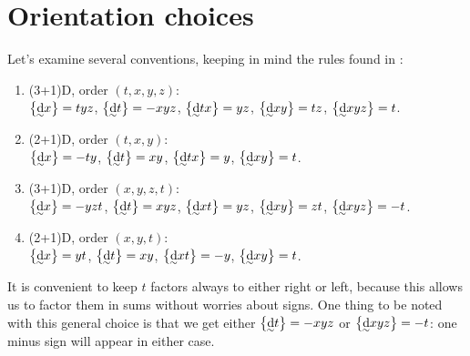 \documentclass[\ifafour a4paper,12pt,\else a5paper,10pt,\fi%
onecolumn,oneside,article,%
british%
]{memoir}
\theoremstyle{remark}
\theoremstyle{innote}
\newcommand*{\di}{\mathrm{d}}%
\DeclarePairedDelimiter\set{\{}{\}} %
\renewcommand*{\|}[1][]{\nonscript\:#1\vert\nonscript\:\mathopen{}}
\newcommand*{\eqns}{eqs}%
\newcommand*{\tw}[2][\scriptstyle\sim]{\smash[b]{\underset{\mathclap{{}^{#1}}}{#2}}}
\newcommand*{\ti}[1][\scriptstyle\sim]{\tw[#1]{\di}}
\begin{document}
\iffalse
\section{Orientation choices}
\label{sec:orientation_choices}

Let's examine several conventions, keeping in mind the rules found in  \cites[\eqns~(5)--(11)]{burke1983}:
\begin{enumerate}[label=(\roman*),para]
\item (3+1)D, order $(t,x,y,z)$:\\
  $\set[\big]{\ti x} = tyz$,\;  $\set[\big]{\ti t} = -xyz$,\;
  $\set[\big]{\ti tx} = yz$,\;  $\set[\big]{\ti xy } = tz$,\;
  $\set[\big]{\ti xyz}=t$.
\item (2+1)D, order $(t,x,y)$:\\
  $\set[\big]{\ti x} = -ty$,\;  $\set[\big]{\ti t} = xy$,\;
  $\set[\big]{\ti tx} = y$,\;  $\set[\big]{\ti xy } = t$.
\item (3+1)D, order $(x,y,z,t)$:\\
  $\set[\big]{\ti x} = -yzt$,\;  $\set[\big]{\ti t} = xyz$,\;
  $\set[\big]{\ti xt} = yz$,\;  $\set[\big]{\ti xy } = zt$,\;
    $\set[\big]{\ti xyz}=-t$.
\item (2+1)D, order $(x,y,t)$:\\
  $\set[\big]{\ti x} = yt$,\;  $\set[\big]{\ti t} = xy$,\;
  $\set[\big]{\ti xt} = -y$,\;  $\set[\big]{\ti xy } = t$.
\end{enumerate}
It is convenient to keep $t$ factors always to either right or left, because this allows us to factor them in sums without worries about signs. One thing to be noted with this general choice is that we get either $\set[\big]{\ti t}=-xyz$ or $\set[\big]{\ti xyz}=-t$: one minus sign will appear in either case.
\end{document}
